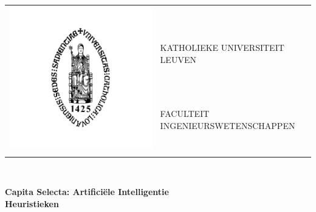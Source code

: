 \documentclass[pdftex,12pt,a4paper]{article}
\begin{document}
\begin{titlepage}

\begin{center}

\begin{flushleft}

\begin{tabular}{l|l}
\multirow{4}{*}{\includegraphics[scale=0.1]{KUL.jpg}} \\ & \\
& KATHOLIEKE UNIVERSITEIT LEUVEN\\[0.5cm]
& FACULTEIT INGENIEURSWETENSCHAPPEN\\
& \\
\end{tabular}\\[8cm]
\end{flushleft}



{\LARGE \textbf{Capita Selecta: Artifici\"ele Intelligentie}}\\[1cm]
\textbf{\LARGE Heuristieken}\\[8cm]



\end{center}
\end{titlepage}
\end{document}
